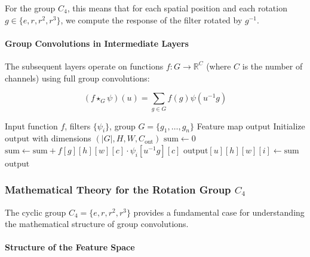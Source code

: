 For the group $C_4$, this means that for each spatial position and each rotation $g \in \{e, r, r^2, r^3\}$, we compute the response of the filter rotated by $g^{-1}$.

\paragraph{Group Convolutions in Intermediate Layers}

The subsequent layers operate on functions $f: G \to \mathbb{R}^C$ (where $C$ is the number of channels) using full group convolutions:

\begin{equation}
(f \star_G \psi)(u) = \sum_{g \in G} f(g) \psi(u^{-1}g)
\label{eq:group_conv_discrete}
\end{equation}

\begin{algorithm}[h]
\caption{G-CNN Convolution for a Finite Group}
\label{alg:gcnn_finite}
\begin{algorithmic}[1]
\Require Input function $f$, filters $\{\psi_i\}$, group $G = \{g_1, \ldots, g_n\}$
\Ensure Feature map $\text{output}$
\State Initialize $\text{output}$ with dimensions $(|G|, H, W, C_{\text{out}})$
            \State $\text{sum} \leftarrow 0$
                    \State $\text{sum} \leftarrow \text{sum} + f[g][h][w][c] \cdot \psi_i[u^{-1}g][c]$
                \EndFor
            \EndFor
            \State $\text{output}[u][h][w][i] \leftarrow \text{sum}$
        \EndFor
    \EndFor
\EndFor
\Return $\text{output}$
\end{algorithmic}
\end{algorithm}

\subsubsection{Mathematical Theory for the Rotation Group $C_4$}

The cyclic group $C_4 = \{e, r, r^2, r^3\}$ provides a fundamental case for understanding the mathematical structure of group convolutions.

\paragraph{Structure of the Feature Space}

